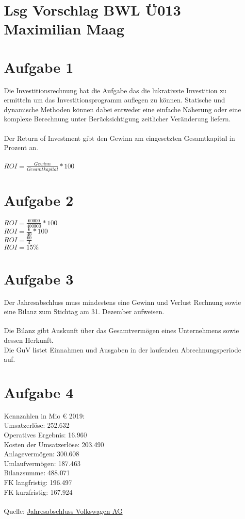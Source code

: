 \documentclass{article}
\begin{document}
	\section*{Lsg Vorschlag BWL Ü013 Maximilian Maag}
	\section*{Aufgabe 1}
	Die Investitionsrechnung hat die Aufgabe das die lukrativste Investition zu ermitteln um das Investitionsprogramm auflegen zu können. Statische und dynamische Methoden können dabei entweder eine einfache Näherung oder eine komplexe Berechnung unter Berücksichtigung zeitlicher Veränderung liefern. \\ \\
	Der Return of Investment gibt den Gewinn am eingesetzten Gesamtkapital in Prozent an. \\ \\
	$ROI = \frac{Gewinn}{Gesamtkapital} * 100$
	\section*{Aufgabe 2}
	$ROI = \frac{60000}{400000}*100$ \\
	$ROI = \frac{6}{40}*100$ \\
	$ROI = \frac{60}{4}$ \\
	$ROI = 15 \%$
	\section*{Aufgabe 3}
	Der Jahresabschluss muss mindestens eine Gewinn und Verlust Rechnung sowie eine Bilanz zum Stichtag am 31. Dezember aufweisen. \\ \\
	Die Bilanz gibt Auskunft über das Gesamtvermögen eines Unternehmens sowie dessen Herkunft. \\
	Die GuV listet Einnahmen und Ausgaben in der laufenden Abrechnungsperiode auf.
	\section*{Aufgabe 4}
	Kennzahlen in Mio € 2019: \\
	Umsatzerlöse: 252.632 \\
	Operatives Ergebnis: 16.960 \\
	Kosten der Umsatzerlöse: 203.490 \\
	Anlagevermögen: 300.608 \\
	Umlaufvermögen: 187.463 \\
	Bilanzsumme: 488.071\\
	FK langfristig: 196.497 \\
	FK kurzfristig: 167.924 \\ \\
	Quelle: \hyperlink{https://www.volkswagenag.com/presence/investorrelation/publications/annual-reports/2020/volkswagen/Y_2019_d.pdf agerufen: 16.02.2021}{Jahresabschluss Volkswagen AG}
\end{document}
